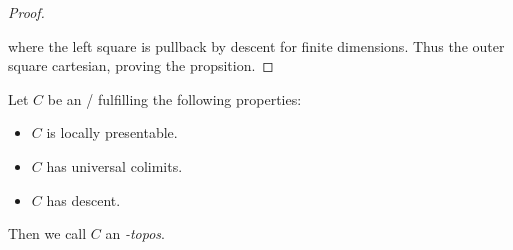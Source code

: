 \begin{lemma}
\begin{proof}
\begin{center}
        \end{center}
        where the left square is pullback by descent for finite dimensions. 
        Thus the outer square cartesian, proving the propsition.
    \end{proof}
\end{lemma}
\begin{definition}
    Let $C$ be an \inftycat/ fulfilling the following properties:
    \begin{itemize}
        \item $C$ is locally presentable.
        \item $C$ has universal colimits.
        \item $C$ has descent.
    \end{itemize}
    Then we call $C$ an \emph{\infty-topos}.
\end{definition}
